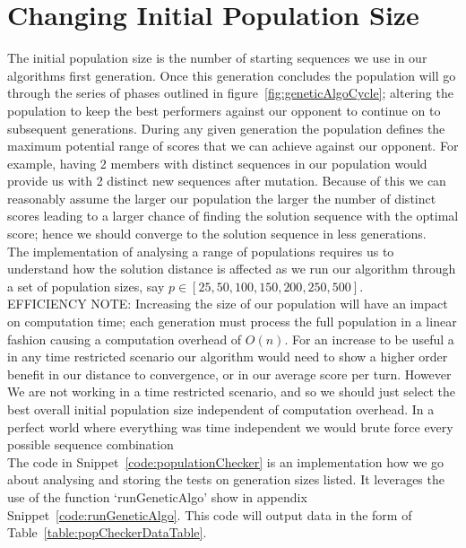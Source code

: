 \section{Changing Initial Population Size}\label{sec:ChangingInitialPopulationSize}
The initial population size is the number of starting sequences we use in our algorithms first generation.
Once this generation concludes the population will go through the series of phases outlined in figure~\ref{fig:geneticAlgoCycle}; altering the population to keep the best performers against our opponent to continue on to subsequent generations.
During any given generation the population defines the maximum potential range of scores that we can achieve against our opponent.
For example, having 2 members with distinct sequences in our population would provide us with 2 distinct new sequences after mutation.
Because of this we can reasonably assume the larger our population the larger the number of distinct scores leading to a larger chance of finding the solution sequence with the optimal score;
hence we should converge to the solution sequence in less generations.\\

The implementation of analysing a range of populations requires us to understand how the solution distance is affected as we run our algorithm through a set of population sizes, say \(p \in [25,50,100,150,200,250,500]\).\\

EFFICIENCY NOTE\@: Increasing the size of our population will have an impact on computation time;
each generation must process the full population in a linear fashion causing a computation overhead of \(O(n)\).
For an increase to be useful a in any time restricted scenario our algorithm would need to show a higher order benefit in our distance to convergence, or in our average score per turn.
However We are not working in a time restricted scenario, and so we should just select the best overall initial population size independent of computation overhead.
In a perfect world where everything was time independent we would brute force every possible sequence combination\\

The code in Snippet~\ref{code:populationChecker} is an implementation how we go about analysing and storing the tests on generation sizes listed.
It leverages the use of the function `runGeneticAlgo' show in appendix Snippet~\ref{code:runGeneticAlgo}.
This code will output data in the form of Table~\ref{table:popCheckerDataTable}.\\

